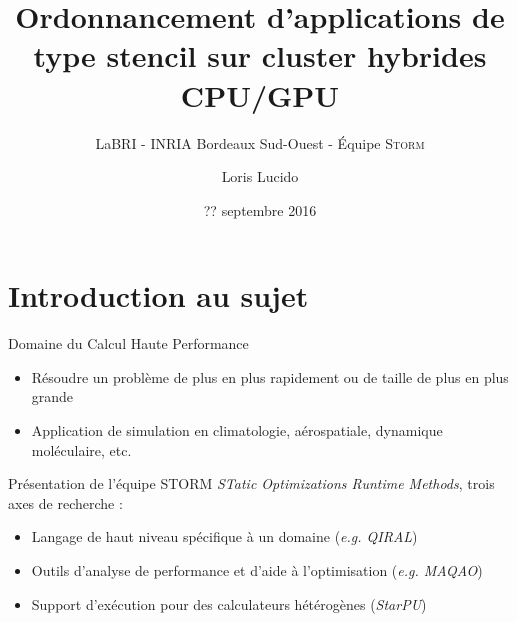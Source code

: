\documentclass[9pt]{beamer}
\author{Loris Lucido}
\date{?? septembre 2016}
\title{Ordonnancement d'applications de type stencil sur cluster hybrides CPU/GPU}
\subtitle{LaBRI - INRIA Bordeaux Sud-Ouest - Équipe \textsc{Storm}}
\begin{document}
\begin{frame}[plain]
  \titlepage
\end{frame}


\section{Introduction au sujet}

\begin{frame}{Domaine du Calcul Haute Performance}
  \begin{itemize}
  \item Résoudre un problème de plus en plus rapidement ou de taille de
    plus en plus grande
    \vfill
  \item Application de simulation en climatologie, aérospatiale, dynamique
    moléculaire, etc.
  \end{itemize}
\end{frame}

\begin{frame}{Présentation de l'équipe \textsc{STORM}}
  \vfill
  \textit{STatic Optimizations Runtime Methods}, trois axes de recherche :
  \vfill
  \begin{itemize}
  \item Langage de haut niveau spécifique à un domaine (\textit{e.g. QIRAL})
  \vfill
  \item Outils d'analyse de performance et d'aide à l'optimisation (\textit{e.g. MAQAO})
  \vfill
  \item Support d'exécution pour des calculateurs hétérogènes (\textit{StarPU})
  \end{itemize}
  \vfill
\end{frame}
\end{document}
